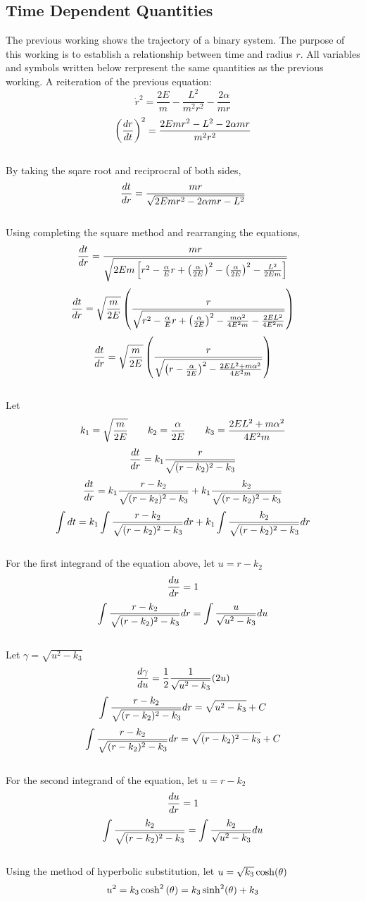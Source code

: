 \documentclass[a4paper, 12pt]{report}
\begin{document}
\begin{center}
\section{Time Dependent Quantities}
\begin{comment}
\end{comment}
The previous working shows the trajectory of a binary system. The purpose of this working is to establish a relationship between time and radius $r$. All variables and symbols written below rerpresent the same quantities as the previous working. A reiteration of the previous equation:
$$\dot{r}^2 = \frac{2E}{m}-\frac{L^2}{m^2r^2}-\frac{2\alpha}{mr}$$
$$\left(\frac{dr}{dt}\right)^2  = \frac{2Emr^2 - L^2 - 2 \alpha mr}{m^2 r^2}$$
\\By taking the sqare root and reciprocral of both sides,
$$\frac{dt}{dr} = \frac{mr}{\sqrt{2Emr^2 - 2 \alpha mr - L^2}}$$
\\Using completing the square method and rearranging the equations,
$$\frac{dt}{dr} = \frac{mr}{\sqrt{2Em\left[r^2 - \frac{\alpha}{E}r + \left(\frac{\alpha}{2E}\right)^2 - \left(\frac{\alpha}{2E}\right)^2 -  \frac{L^2}{2Em}\right]}}$$
$$\frac{dt}{dr} = \sqrt{\frac{m}{2E}}\left(\frac{r}{\sqrt{r^2 - \frac{\alpha}{E}r + \left(\frac{\alpha}{2E}\right)^2 - \frac{m\alpha ^ 2}{4 E^2 m} -  \frac{2E L^2}{4 E^2 m}}}\right)$$
$$\frac{dt}{dr} = \sqrt{\frac{m}{2E}}\left(\frac{r}{\sqrt{\left(r - \frac{\alpha}{2E}\right)^2 -  \frac{2E L^2 + m\alpha ^ 2}{4 E^2 m}}}\right)$$
\\Let
$$k_1 = \sqrt{\frac{m}{2E}} \qquad k_2 = \frac{\alpha}{2E} \qquad k_3 = \frac{2E L^2 + m\alpha ^ 2}{4 E^2 m}$$
$$\frac{dt}{dr} = k_1 \frac{r}{\sqrt{(r - k_2)^2 - k_3}}$$
$$\frac{dt}{dr} = k_1 \frac{r - k_2}{\sqrt{(r - k_2)^2 - k_3}} + k_1 \frac{k_2}{\sqrt{(r - k_2)^2 - k_3}}$$
$$\int dt= k_1 \int \frac{r - k_2}{\sqrt{(r - k_2)^2 - k_3}} dr + k_1 \int \frac{k_2}{\sqrt{(r - k_2)^2 - k_3}} dr$$
\\For the first integrand of the equation above, let $u = r - k_2$
$$\frac{du}{dr} = 1$$
$$\int \frac{r - k_2}{\sqrt{(r - k_2)^2 - k_3}} dr = \int \frac{u}{\sqrt{u^2 - k_3}} du$$
\\Let $\gamma = \sqrt{u^2 - k_3}$
$$\frac{d\gamma}{du} = \frac{1}{2}\frac{1}{\sqrt{u^2 - k_3}}(2u)$$
$$\int \frac{r - k_2}{\sqrt{(r - k_2)^2 - k_3}} dr = \sqrt{u^2 - k_3} + C$$
$$\int \frac{r - k_2}{\sqrt{(r - k_2)^2 - k_3}} dr = \sqrt{(r - k_2)^2 - k_3} + C$$
\\For the second integrand of the equation, let $u = r - k_2$
$$\frac{du}{dr} = 1$$
$$\int \frac{k_2}{\sqrt{(r - k_2)^2 - k_3}} = \int \frac{k_2}{\sqrt{u^2 - k_3}} du$$
\\Using the method of hyperbolic substitution, let $u = \sqrt{k_3}\cosh(\theta)$
$$u^2 = k_3\cosh^2\left(\theta\right) = k_3\sinh^2(\theta) + k_3$$

\end{center}
\end{document}
